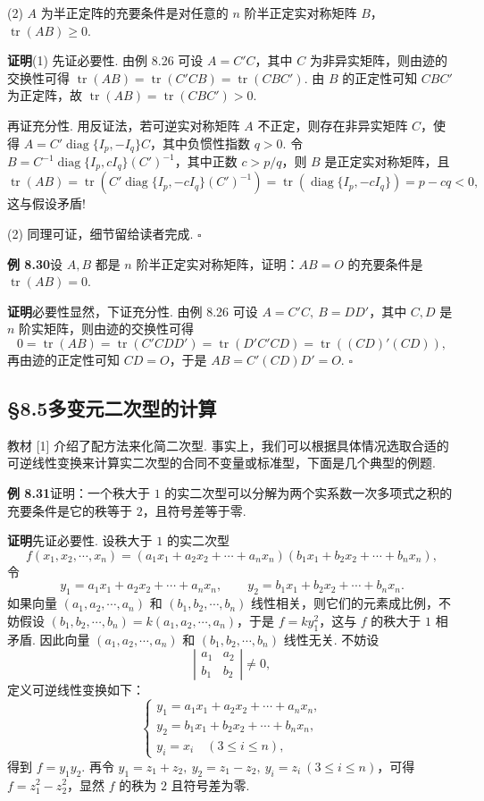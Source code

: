 \documentclass[UTF8, 12pt, fontset=fandol, oneside]{ctexart}
\begin{document}
(2) $A$ 为半正定阵的充要条件是对任意的 $n$ 阶半正定实对称矩阵 $B$，$\operatorname{tr}(AB)\ge 0$.

\noindent\textbf{证明}\quad (1) 先证必要性. 由例 8.26 可设 $A=C'C$，其中 $C$ 为非异实矩阵，则由迹的交换性可得 $\operatorname{tr}(AB)=\operatorname{tr}(C'CB)=\operatorname{tr}(CBC')$. 由 $B$ 的正定性可知 $CBC'$ 为正定阵，故 $\operatorname{tr}(AB)=\operatorname{tr}(CBC')>0$.

再证充分性. 用反证法，若可逆实对称矩阵 $A$ 不正定，则存在非异实矩阵 $C$，使得 $A=C'\operatorname{diag}\{I_p,-I_q\}C$，其中负惯性指数 $q>0$. 令 $B=C^{-1}\operatorname{diag}\{I_p,cI_q\}(C')^{-1}$，其中正数 $c>p/q$，则 $B$ 是正定实对称矩阵，且
\[
\operatorname{tr}(AB)=\operatorname{tr}\left(C'\operatorname{diag}\{I_p,-cI_q\}(C')^{-1}\right)
=\operatorname{tr}(\operatorname{diag}\{I_p,-cI_q\})=p-cq<0,
\]
这与假设矛盾!

(2) 同理可证，细节留给读者完成. $\ensuremath{\square}$

\noindent\textbf{例 8.30}\quad 设 $A,B$ 都是 $n$ 阶半正定实对称矩阵，证明：$AB=O$ 的充要条件是 $\operatorname{tr}(AB)=0$.

\noindent\textbf{证明}\quad 必要性显然，下证充分性. 由例 8.26 可设 $A=C'C,\ B=DD'$，其中 $C,D$ 是 $n$ 阶实矩阵，则由迹的交换性可得
\[
0=\operatorname{tr}(AB)=\operatorname{tr}(C'CDD')=\operatorname{tr}(D'C'CD)=\operatorname{tr}((CD)'(CD)),
\]
再由迹的正定性可知 $CD=O$，于是 $AB=C'(CD)D'=O$. $\ensuremath{\square}$

\subsection*{§8.5\quad 多变元二次型的计算}

教材 [1] 介绍了配方法来化简二次型. 事实上，我们可以根据具体情况选取合适的可逆线性变换来计算实二次型的合同不变量或标准型，下面是几个典型的例题.

\noindent\textbf{例 8.31}\quad 证明：一个秩大于 $1$ 的实二次型可以分解为两个实系数一次多项式之积的充要条件是它的秩等于 $2$，且符号差等于零.

\noindent\textbf{证明}\quad 先证必要性. 设秩大于 $1$ 的实二次型
\[
f(x_1,x_2,\cdots,x_n)=(a_1x_1+a_2x_2+\cdots+a_nx_n)(b_1x_1+b_2x_2+\cdots+b_nx_n),
\]
令
\[
y_1=a_1x_1+a_2x_2+\cdots+a_nx_n,\qquad
y_2=b_1x_1+b_2x_2+\cdots+b_nx_n.
\]
如果向量 $(a_1,a_2,\cdots,a_n)$ 和 $(b_1,b_2,\cdots,b_n)$ 线性相关，则它们的元素成比例，不妨假设 $(b_1,b_2,\cdots,b_n)=k(a_1,a_2,\cdots,a_n)$，于是 $f=ky_1^2$，这与 $f$ 的秩大于 $1$ 相矛盾. 因此向量 $(a_1,a_2,\cdots,a_n)$ 和 $(b_1,b_2,\cdots,b_n)$ 线性无关. 不妨设
\[
\left|\begin{array}{cc}
a_1 & a_2\\
b_1 & b_2
\end{array}\right|\ne 0,
\]
定义可逆线性变换如下：
\[
\left\{\begin{array}{l}
y_1=a_1x_1+a_2x_2+\cdots+a_nx_n,\\
y_2=b_1x_1+b_2x_2+\cdots+b_nx_n,\\
y_i=x_i\quad (3\le i\le n),
\end{array}\right.
\]
得到 $f=y_1y_2$. 再令 $y_1=z_1+z_2,\ y_2=z_1-z_2,\ y_i=z_i\ (3\le i\le n)$，可得 $f=z_1^2-z_2^2$，显然 $f$ 的秩为 $2$ 且符号差为零.
\end{document}
